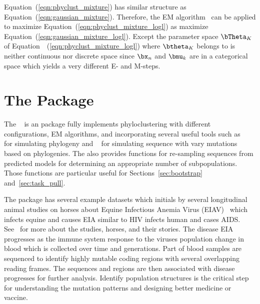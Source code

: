 \begin{enumerate}
\end{enumerate}

Equation~(\ref{eqn:phyclust_mixture}) has similar structure
as Equation~(\ref{eqn:gaussian_mixture}). Therefore, the
EM algorithm~\citep{Dempster1977}
can be applied to maximize Equation~(\ref{eqn:phyclust_mixture_logl})
as maximize Equation~(\ref{eqn:gaussian_mixture_logl}).
Except the parameter space $\bTheta_K$ of
Equation~~(\ref{eqn:phyclust_mixture_logl}) where $\btheta_K$ belongs to
is neither continuous nor discrete space since $\bx_n$ and $\bmu_k$ are
in a categorical space which yields a very different E- and M-steps.


\section{The  Package}
\label{sec:phyclust}

The ~\citep{Chen2011a}
is an  package fully implements
phyloclustering with different configurations, EM algorithms, and
incorporating several useful tools such as ~\citep{Hudson2002}
for simulating phylogeny and ~\citep{Rambaut1997}
for simulating sequence with vary mutations based on phylogenies.
The  also provides functions for re-sampling sequences from
predicted models for determining an appropriate number of subpopulations.
Those functions are particular useful for Sections~\ref{sec:bootstrap}
and~\ref{sec:task_pull}.

The  package has several example datasets which initials by
several longitudinal animal studies on horses about Equine Infectious Anemia
Virus (EIAV)~\citep{Leroux2004} which infects equine and causes EIA
similar to HIV infects human and cases AIDS.
See~\citet{Baccam2003} for more about the studies, horses, and their stories.
The disease EIA progresses as the immune system
response to the viruses population change in blood which is collected
over time and generations. Part of blood samples are sequenced to identify
highly mutable coding regions with several overlapping reading frames. The
sequences and regions are then associated with disease progresses for
further analysis. Identify population structures is the critical step for
understanding the mutation patterns and designing better medicine or vaccine.

